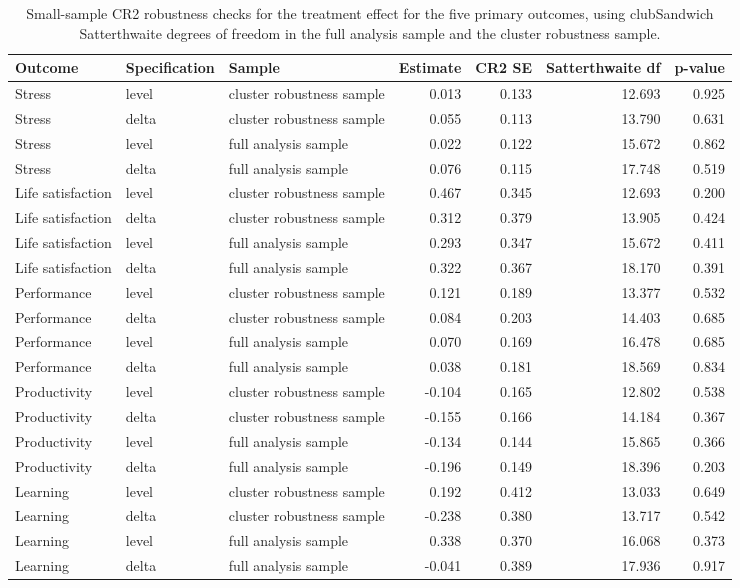 \begin{table}

\caption{\label{tab:cr2-satterthwaite}Small-sample CR2 robustness checks for the treatment effect for the five primary outcomes, using clubSandwich Satterthwaite degrees of freedom in the full analysis sample and the cluster robustness sample.}
\centering
\begin{tabular}[t]{lllrrrr}
\toprule
Outcome & Specification & Sample & Estimate & CR2 SE & Satterthwaite df & p-value\\
\midrule
Stress & level & cluster robustness sample & 0.013 & 0.133 & 12.693 & 0.925\\
Stress & delta & cluster robustness sample & 0.055 & 0.113 & 13.790 & 0.631\\
Stress & level & full analysis sample & 0.022 & 0.122 & 15.672 & 0.862\\
Stress & delta & full analysis sample & 0.076 & 0.115 & 17.748 & 0.519\\
Life satisfaction & level & cluster robustness sample & 0.467 & 0.345 & 12.693 & 0.200\\
Life satisfaction & delta & cluster robustness sample & 0.312 & 0.379 & 13.905 & 0.424\\
Life satisfaction & level & full analysis sample & 0.293 & 0.347 & 15.672 & 0.411\\
Life satisfaction & delta & full analysis sample & 0.322 & 0.367 & 18.170 & 0.391\\
Performance & level & cluster robustness sample & 0.121 & 0.189 & 13.377 & 0.532\\
Performance & delta & cluster robustness sample & 0.084 & 0.203 & 14.403 & 0.685\\
Performance & level & full analysis sample & 0.070 & 0.169 & 16.478 & 0.685\\
Performance & delta & full analysis sample & 0.038 & 0.181 & 18.569 & 0.834\\
Productivity & level & cluster robustness sample & -0.104 & 0.165 & 12.802 & 0.538\\
Productivity & delta & cluster robustness sample & -0.155 & 0.166 & 14.184 & 0.367\\
Productivity & level & full analysis sample & -0.134 & 0.144 & 15.865 & 0.366\\
Productivity & delta & full analysis sample & -0.196 & 0.149 & 18.396 & 0.203\\
Learning & level & cluster robustness sample & 0.192 & 0.412 & 13.033 & 0.649\\
Learning & delta & cluster robustness sample & -0.238 & 0.380 & 13.717 & 0.542\\
Learning & level & full analysis sample & 0.338 & 0.370 & 16.068 & 0.373\\
Learning & delta & full analysis sample & -0.041 & 0.389 & 17.936 & 0.917\\
\bottomrule
\end{tabular}
\end{table}

